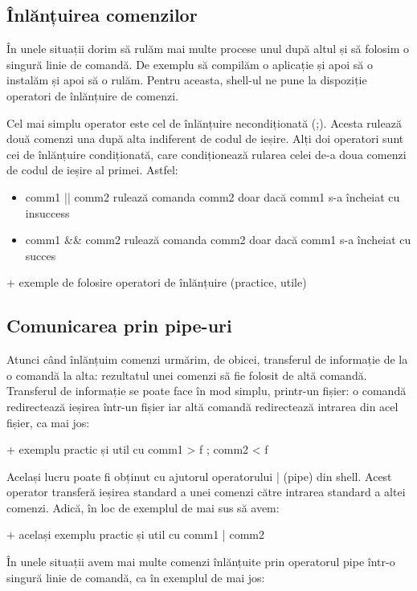 \subsection{Înlănțuirea comenzilor}
\label{sec:procese-operatii-inlantuire}

În unele situații dorim să rulăm mai multe procese unul după altul și să folosim
o singură linie de comandă. De exemplu să compilăm o aplicație și apoi să o
instalăm și apoi să o rulăm. Pentru aceasta, shell-ul ne pune la dispoziție
operatori de înlănțuire de comenzi.

Cel mai simplu operator este cel de înlănțuire necondiționată (;). Acesta
rulează două comenzi una după alta indiferent de codul de ieșire. Alți doi
operatori sunt cei de înlănțuire condiționată, care condiționează rularea celei
de-a doua comenzi de codul de ieșire al primei. Astfel:

\begin{itemize}
	\item comm1 || comm2 rulează comanda comm2 doar dacă comm1 s-a încheiat
		cu insuccess
	\item comm1 \&\& comm2 rulează comanda comm2 doar dacă comm1 s-a
		încheiat cu succes
\end{itemize}

+ exemple de folosire operatori de înlănțuire (practice, utile)

\subsection{Comunicarea prin pipe-uri}
\label{sec:procese-operatii-pipe}

Atunci când înlănțuim comenzi urmărim, de obicei, transferul de informație de la
o comandă la alta: rezultatul unei comenzi să fie folosit de altă comandă.
Transferul de informație se poate face în mod simplu, printr-un fișier: o
comandă redirectează ieșirea într-un fișier iar altă comandă redirectează
intrarea din acel fișier, ca mai jos:

+     exemplu practic și util cu comm1 > f ; comm2 < f

Același lucru poate fi obținut cu ajutorul operatorului | (pipe) din shell.
Acest operator transferă ieșirea standard a unei comenzi către intrarea standard
a altei comenzi. Adică, în loc de exemplul de mai sus să avem:

+     același exemplu practic și util cu comm1 | comm2

În unele situații avem mai multe comenzi înlănțuite prin operatorul pipe într-o
singură linie de comandă, ca în exemplul de mai jos:

